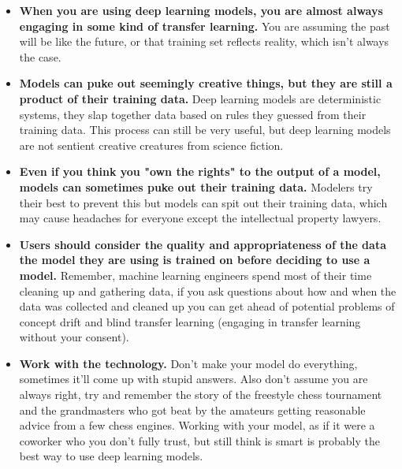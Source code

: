 \begin{itemize}
    \item \textbf{When you are using deep learning models, you are almost always engaging in some kind of transfer learning.} You are assuming the past will be like the future, or that training set reflects reality, which isn't always the case. 
    \item \textbf{Models can puke out seemingly creative things, but they are still a product of their training data.} Deep learning models are deterministic systems, they slap together data based on rules they guessed from their training data. This process can still be very useful, but deep learning models are not sentient creative creatures from science fiction.
    \item \textbf{Even if you think you "own the rights" to the output of a model, models can sometimes puke out their training data.} Modelers try their best to prevent this but models can spit out their training data, which may cause headaches for everyone except the intellectual property lawyers. 
    \item \textbf{Users should consider the quality and appropriateness of the data the model they are using is trained on before deciding to use a model.} Remember, machine learning engineers spend most of their time cleaning up and gathering data, if you ask questions about how and when the data was collected and cleaned up you can get ahead of potential problems of concept drift and blind transfer learning (engaging in transfer learning without your consent).
    \item \textbf{Work with the technology.} Don't make your model do everything, sometimes it'll come up with stupid answers. Also don't assume you are always right, try and remember the story of the freestyle chess tournament and the grandmasters who got beat by the amateurs getting reasonable advice from a few chess engines. Working with your model, as if it were a coworker who you don't fully trust, but still think is smart is probably the best way to use deep learning models.
\end{itemize}

